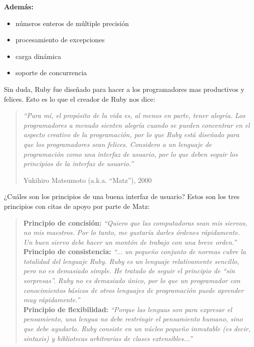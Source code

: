 \documentclass{article}
\begin{document}
\textbf{Además:}
\begin{itemize}
\itemsep=2pt \topsep=0pt \partopsep=0pt \parskip=0pt \parsep=0pt
	\item números enteros de múltiple precisión
	\item procesamiento de excepciones
	\item carga dinámica
	\item soporte de concurrencia
\end{itemize}
\bigskip\bigskip

Sin duda, Ruby fue diseñado para hacer a los programadores mas productivos y felices. Esto es lo que el creador de Ruby nos dice:

\begin{quotation}
\em``Para mí, el propósito de la vida es, al menos en parte, tener alegría. Los programadores a menudo sienten alegría cuando se pueden concentrar en el aspecto creativo de la programación, por lo que Ruby está diseñado para que los programadores sean felices. Considero a un lenguaje de programación como una interfaz de usuario, por lo que deben seguir los principios de la interfaz de usuario.''

\begin{flushright} Yukihiro Matsumoto (a.k.a. “Matz”), 2000 \end{flushright}
\end{quotation}

\newpage
¿Cuáles son los principios de una buena interfaz de usuario? Estos son los tres principios con citas de apoyo por parte de Matz:\\

\begin{quotation}
\noindent \textbf{Principio de concisión:} \textit{``Quiero que las computadoras sean mis siervos, no mis maestros. Por lo tanto, me gustaría darles órdenes rápidamente. Un buen siervo debe hacer un montón de trabajo con una breve orden.''}\\

\noindent \textbf{Principio de consistencia:} \textit{``... un pequeño conjunto de normas cubre la totalidad del lenguaje Ruby. Ruby es un lenguaje relativamente sencillo, pero no es demasiado simple. He tratado de seguir el principio de ``sin sorpresas''. Ruby no es demasiado único, por lo que un programador con conocimientos básicos de otros lenguajes de programación puede aprender muy rápidamente.''}\\

\noindent \textbf{Principio de flexibilidad:} \textit{``Porque las lenguas son para expresar el pensamiento, una lengua no debe restringir el pensamiento humano, sino que debe ayudarlo. Ruby consiste en un núcleo pequeño inmutable (es decir, sintaxis) y bibliotecas arbitrarias de clases extensibles...''}
\end{quotation}
\bigskip
\end{document}
